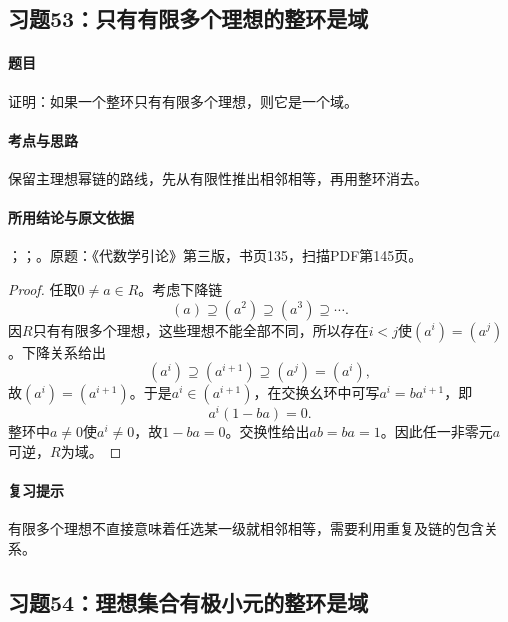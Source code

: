 \subsection{习题53：只有有限多个理想的整环是域}

\label{ex:3:53}

\paragraph{题目}

证明：如果一个整环只有有限多个理想，则它是一个域。

\paragraph{考点与思路}

保留主理想幂链的路线，先从有限性推出相邻相等，再用整环消去。

\paragraph{所用结论与原文依据}

；；。原题：《代数学引论》第三版，书页135，扫描PDF第145页。


\begin{proof}

任取$0\ne a\in R$。考虑下降链
\[
(a)\supseteq(a^2)\supseteq(a^3)\supseteq\cdots.
\]
因$R$只有有限多个理想，这些理想不能全部不同，所以存在$i<j$使$(a^i)=(a^j)$。下降关系给出
\[
(a^i)\supseteq(a^{i+1})\supseteq(a^j)=(a^i),
\]
故$(a^i)=(a^{i+1})$。于是$a^i\in(a^{i+1})$，在交换幺环中可写$a^i=ba^{i+1}$，即
\[
a^i(1-ba)=0.
\]
整环中$a\ne0$使$a^i\ne0$，故$1-ba=0$。交换性给出$ab=ba=1$。因此任一非零元$a$可逆，$R$为域。

\end{proof}

\paragraph{复习提示}

有限多个理想不直接意味着任选某一级就相邻相等，需要利用重复及链的包含关系。



\subsection{习题54：理想集合有极小元的整环是域}

